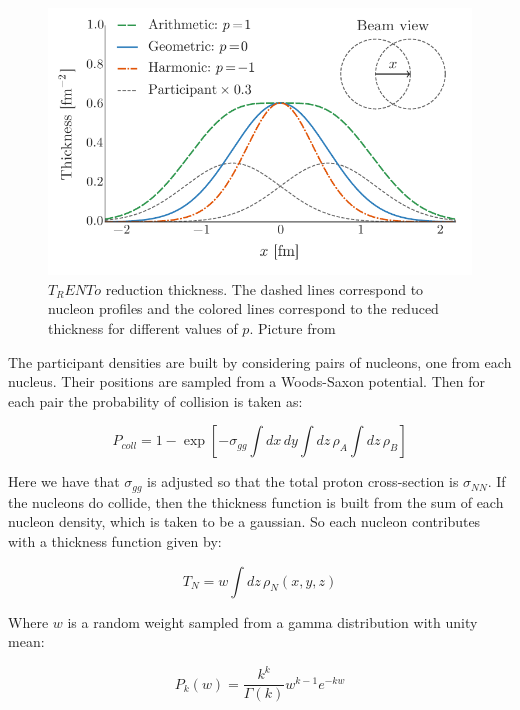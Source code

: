 \begin{figure}
\includegraphics[width=1.0\textwidth]{images/trento_thick.png}
\caption[$T_RENTo$ reduction thickness.]{$T_RENTo$ reduction thickness. The dashed lines correspond to nucleon profiles and the colored lines correspond to the reduced thickness for different values of $p$. Picture from \cite{moreland_alternative_2015}}
\label{trento_thick}
\end{figure}

The participant densities are built by considering pairs of nucleons, one from each nucleus. Their positions are sampled from a Woods-Saxon potential. Then for each pair the probability of collision is taken as:

\begin{equation}
P_{coll} = 1 - \exp \left[ -\sigma_{gg} \int dx \, dy \int dz \, \rho_A \int dz \, \rho_B \right]
\end{equation}

Here we have that $\sigma_{gg}$ is adjusted so that the total proton cross-section is $\sigma_{NN}$\cite{moreland_alternative_2015}. If the nucleons do collide, then the thickness function is built from the sum of each nucleon density, which is taken to be a gaussian. So each nucleon contributes with a thickness function given by:

\begin{equation}
T_{N} = w \int dz \, \rho_N (x,y,z) 
\end{equation}

Where $w$ is a random weight sampled from a gamma distribution with unity mean:

\begin{equation}
P_k(w)=\frac{k^k}{\Gamma(k)} w^{k-1} e^{-kw}
\end{equation}

